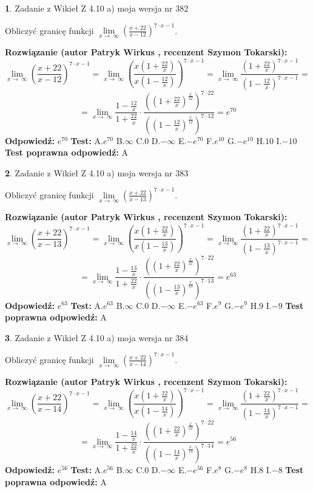 \documentclass[12pt, a4paper]{article}
\theoremstyle{definition} %
\newtheorem{zad}{}
\newcommand{\zadStart}[1]{\begin{zad}#1\newline}
\newcommand{\zadStop}{\end{zad}}
\newcommand{\rozwStart}[2]{\noindent \textbf{Rozwiązanie (autor #1 , recenzent #2): }\newline}
\newcommand{\rozwStop}{\newline}
\newcommand{\odpStart}{\noindent \textbf{Odpowiedź:}\newline}
\newcommand{\odpStop}{\newline}
\newcommand{\testStart}{\noindent \textbf{Test:}\newline}
\newcommand{\testStop}{\newline}
\newcommand{\kluczStart}{\noindent \textbf{Test poprawna odpowiedź:}\newline}
\newcommand{\kluczStop}{\newline}
\begin{document}
\zadStart{Zadanie z Wikieł Z 4.10 a) moja wersja nr 382}

Obliczyć granicę funkcji  $\lim\limits_{x\to\ \infty}(\frac{x+22}{x-12})^{7\cdot x-1}$.
\zadStop
\rozwStart{Patryk Wirkus}{Szymon Tokarski}
$$\lim\limits_{x\to\ \infty}(\frac{x+22}{x-12})^{7\cdot x-1} = \lim\limits_{x\to\ \infty}(\frac{x(1+\frac{22}{x})}{x(1-\frac{12}{x})})^{7\cdot x-1}=\lim\limits_{x\to\ \infty}\frac{(1+\frac{22}{x})^{7\cdot x-1}}{(1-\frac{12}{x})^{7\cdot x-1}}=$$
$$=\lim\limits_{x\to\ \infty}\frac{1-\frac{12}{x}}{1+\frac{22}{x}}\cdot\frac{((1+\frac{22}{x})^{\frac{x}{22}})^{7\cdot22}}{((1-\frac{12}{x})^{\frac{x}{12}})^{7\cdot12}}=e^{70}$$
\rozwStop
\odpStart
$e^{70}$
\odpStop
\testStart
A.$e^{70}$ B.$\infty$ C.$0$ D.$-\infty$ E.$-e^{70}$
F.$e^{10}$ G.$-e^{10}$
H.$10$
I.$-10$
\testStop
\kluczStart
A
\kluczStop



\zadStart{Zadanie z Wikieł Z 4.10 a) moja wersja nr 383}

Obliczyć granicę funkcji  $\lim\limits_{x\to\ \infty}(\frac{x+22}{x-13})^{7\cdot x-1}$.
\zadStop
\rozwStart{Patryk Wirkus}{Szymon Tokarski}
$$\lim\limits_{x\to\ \infty}(\frac{x+22}{x-13})^{7\cdot x-1} = \lim\limits_{x\to\ \infty}(\frac{x(1+\frac{22}{x})}{x(1-\frac{13}{x})})^{7\cdot x-1}=\lim\limits_{x\to\ \infty}\frac{(1+\frac{22}{x})^{7\cdot x-1}}{(1-\frac{13}{x})^{7\cdot x-1}}=$$
$$=\lim\limits_{x\to\ \infty}\frac{1-\frac{13}{x}}{1+\frac{22}{x}}\cdot\frac{((1+\frac{22}{x})^{\frac{x}{22}})^{7\cdot22}}{((1-\frac{13}{x})^{\frac{x}{13}})^{7\cdot13}}=e^{63}$$
\rozwStop
\odpStart
$e^{63}$
\odpStop
\testStart
A.$e^{63}$ B.$\infty$ C.$0$ D.$-\infty$ E.$-e^{63}$
F.$e^{9}$ G.$-e^{9}$
H.$9$
I.$-9$
\testStop
\kluczStart
A
\kluczStop



\zadStart{Zadanie z Wikieł Z 4.10 a) moja wersja nr 384}

Obliczyć granicę funkcji  $\lim\limits_{x\to\ \infty}(\frac{x+22}{x-14})^{7\cdot x-1}$.
\zadStop
\rozwStart{Patryk Wirkus}{Szymon Tokarski}
$$\lim\limits_{x\to\ \infty}(\frac{x+22}{x-14})^{7\cdot x-1} = \lim\limits_{x\to\ \infty}(\frac{x(1+\frac{22}{x})}{x(1-\frac{14}{x})})^{7\cdot x-1}=\lim\limits_{x\to\ \infty}\frac{(1+\frac{22}{x})^{7\cdot x-1}}{(1-\frac{14}{x})^{7\cdot x-1}}=$$
$$=\lim\limits_{x\to\ \infty}\frac{1-\frac{14}{x}}{1+\frac{22}{x}}\cdot\frac{((1+\frac{22}{x})^{\frac{x}{22}})^{7\cdot22}}{((1-\frac{14}{x})^{\frac{x}{14}})^{7\cdot14}}=e^{56}$$
\rozwStop
\odpStart
$e^{56}$
\odpStop
\testStart
A.$e^{56}$ B.$\infty$ C.$0$ D.$-\infty$ E.$-e^{56}$
F.$e^{8}$ G.$-e^{8}$
H.$8$
I.$-8$
\testStop
\kluczStart
A
\kluczStop
\end{document}
